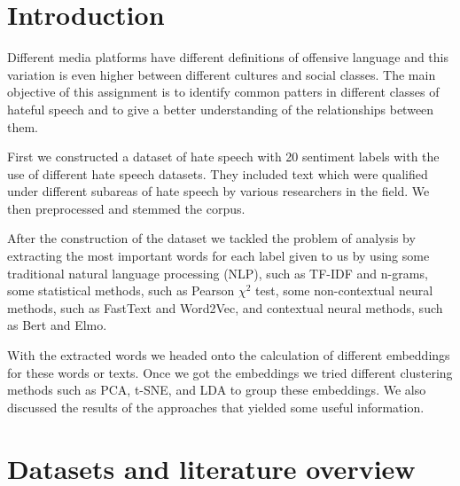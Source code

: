 \documentclass[fleqn,moreauthors,10pt]{ds_report}
\affiliation{\textit{Advisors: Slavko Žitnik}}
\begin{document}
\flushbottom 

\maketitle 

\thispagestyle{empty} 


\section*{Introduction}
Different media platforms have different definitions of offensive language and this variation is even higher between different cultures and social classes. The main objective of this assignment is to identify common patters in different classes of hateful speech and to give a better understanding of the relationships between them. 

First we constructed a dataset of hate speech with 20 sentiment labels with the use of different hate speech datasets. They included text which were qualified under different subareas of hate speech by various researchers in the field. We then preprocessed and stemmed the corpus.

After the construction of the dataset we tackled the problem of analysis by extracting the most important words for each label given to us by using some traditional natural language processing (NLP), such as TF-IDF and n-grams, some statistical methods, such as Pearson $\chi^2$ test, some non-contextual neural methods, such as FastText and Word2Vec, and contextual neural methods, such as Bert and Elmo.

With the extracted words we headed onto the calculation of different embeddings for these words or texts. Once we got the embeddings we tried different clustering methods such as PCA, t-SNE, and LDA to group these embeddings. We also discussed the results of the approaches that yielded some useful information.



\section*{Datasets and literature overview}
\end{document}
